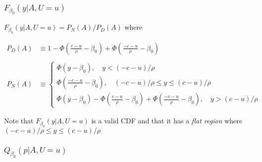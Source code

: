 \begin{frame}
  \frametitle{$F_{\beta_0}(y|A,U=u)$}

  \footnotesize
    $F_{\beta_0}(y|A,U=u) = P_N(A) / P_D(A)$ where

  \begin{align*}
    P_D(A) &\equiv 1 - \Phi\left( \displaystyle \frac{c - u}{\rho} - \beta_0 \right) + \Phi\left( \displaystyle \frac{-c- u}{\rho} - \beta_0 \right)\\ \\
    P_N(A) &\equiv  \left\{
 \begin{array}{l}
   \Phi\left( y - \beta_0 \right), \quad y < (-c - u)/\rho \\
   \Phi\left(\displaystyle \frac{-c-u}{\rho} - \beta_0 \right), \quad (-c - u)/\rho \leq y \leq (c - u)/\rho \\
   \Phi(y - \beta_0) - \Phi\left( \displaystyle \frac{c - u}{\rho} - \beta_0 \right) + \Phi\left(\displaystyle \frac{-c-u}{\rho} - \beta_0 \right), \quad y > (c - u)/\rho 
 \end{array}
 \right.
  \end{align*}

  \vspace{1em}

  \alert{Note that $F_{\beta_0}(y|A,U=u)$ is a valid CDF and that it has a \emph{flat region} where $(-c-u)/\rho \leq y \leq (c - u)/\rho$}
\end{frame}

\begin{frame}
  \frametitle{$Q_{\beta_0}(p|A,U=u)$}

\end{frame}

